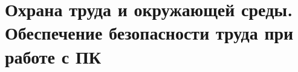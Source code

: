 \newpage
\section{Охрана труда и окружающей среды. Обеспечение
         безопасности труда при работе с ПК}


\newpage

\newpage

\newpage

